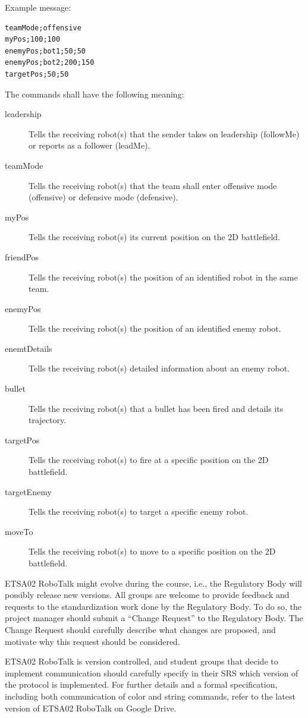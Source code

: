 \documentclass{scrreprt}
\begin{document}
Example message:

\begin{verbatim}
teamMode;offensive
myPos;100;100
enemyPos;bot1;50;50
enemyPos;bot2;200;150
targetPos;50;50
\end{verbatim}

The commands shall have the following meaning:

\begin{description}
\item[leadership] Tells the receiving robot(s) that the sender takes on leadership (followMe) or reports as a follower (leadMe).
\item[teamMode] Tells the receiving robot(s) that the team shall enter offensive mode (offensive) or defensive mode (defensive).
\item[myPos] Tells the receiving robot(s) its current position on the 2D battlefield.
\item[friendPos] Tells the receiving robot(s) the position of an identified robot in the same team.
\item[enemyPos] Tells the receiving robot(s) the position of an identified enemy robot.
\item[enemtDetails] Tells the receiving robot(s) detailed information about an enemy robot.
\item[bullet] Tells the receiving robot(s) that a bullet has been fired and details its trajectory.
\item[targetPos] Tells the receiving robot(s) to fire at a specific position on the 2D battlefield.
\item[targetEnemy] Tells the receiving robot(s) to target a specific enemy robot.
\item[moveTo] Tells the receiving robot(s) to move to a specific position on the 2D battlefield.
\end{description}

ETSA02 RoboTalk might evolve during the course, i.e., the Regulatory Body will possibly release new versions. All groups are welcome to provide feedback and requests to the standardization work done by the Regulatory Body. To do so, the project manager should submit a ``Change Request'' to the Regulatory Body. The Change Request should carefully describe what changes are proposed, and motivate why this request should be considered.

ETSA02 RoboTalk is version controlled, and student groups that decide to implement communication should carefully specify in their SRS which version of the protocol is implemented. For further details and a formal specification, including both communication of color and string commands, refer to the latest version of ETSA02 RoboTalk on Google Drive.
\end{document}
